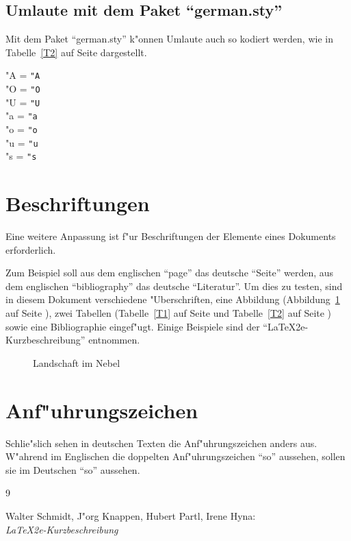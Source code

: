 ﻿\documentclass[11pt]{report} %
\begin{document}
\subsection{Umlaute mit dem Paket "`german.sty"'}
Mit dem Paket "`german.sty"' k"onnen Umlaute auch so kodiert werden, wie
in Tabelle~\ref{T2} auf Seite \pageref{T2} dargestellt.
\begin{table}[ht]
"A = \verb|"A|\\
"O = \verb|"O|\\
"U = \verb|"U|\\
"a = \verb|"a|\\
"o = \verb|"o|\\
"u = \verb|"u|\\
"s = \verb|"s|\\
\caption{Tabelle der Umlaute mit dem Paket "`german.sty"'} 
\label{T2}
\end{table}

\section{Beschriftungen}

Eine weitere Anpassung ist f"ur Beschriftungen der Elemente eines
Dokuments erforderlich. 

Zum Beispiel soll aus dem englischen "`page"' das deutsche "`Seite"'
werden, aus dem englischen "`bibliography"' das deutsche "`Literatur"'.
Um dies zu testen, sind in diesem Dokument verschiedene "Uberschriften,
eine Abbildung (Abbildung~\ref{A1} auf Seite \pageref{A1}), zwei
Tabellen (Tabelle~\ref{T1} auf Seite \pageref{T1} und Tabelle~\ref{T2}
auf Seite \pageref{T2}) sowie eine Bibliographie eingef"ugt. Einige
Beispiele sind der "`LaTeX2e-Kurzbeschreibung"' \cite{l2kurz} entnommen.


\begin{figure}[tb]
\vspace{4cm}
\caption{Landschaft im Nebel} 
\label{A1}
\end{figure}

\section{Anf"uhrungszeichen}

Schlie"slich sehen in deutschen Texten die Anf"uhrungszeichen anders
aus. W"ahrend im Englischen die doppelten Anf"uhrungszeichen ``so''
aussehen, sollen sie im Deutschen "`so"' aussehen. 


\begin{thebibliography}{9} 
 
Walter Schmidt, J"org Knappen, Hubert Partl, Irene Hyna:\\
\textit{LaTeX2e-Kurzbeschreibung}


\end{thebibliography}
 
\end{document}
